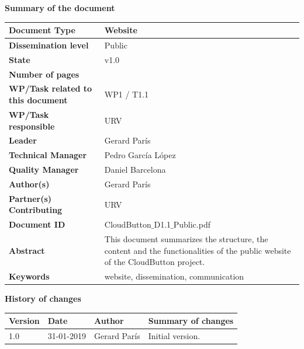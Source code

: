 \documentclass[a4paper,11pt]{article}
\numberwithin{table}{subsection} %
\begin{document}
{
\def\arraystretch{1.5} %

{\LARGE \textbf{Summary of the document}}

\begin{center}
    \begin{tabular}{ | l | p{10cm} |}
    \hline
    \cellcolor{gray!25} \textbf{Document Type} & Website  \\ \hline
    \cellcolor{gray!25} \textbf{Dissemination level} & Public \\ \hline
    \cellcolor{gray!25} \textbf{State} & v1.0 \\ \hline
    \cellcolor{gray!25} \textbf{Number of pages} & \pageref{LastPage} \\ \hline
    \cellcolor{gray!25} \textbf{WP/Task related to this document} & WP1 / T1.1 \\ \hline
    \cellcolor{gray!25} \textbf{WP/Task responsible} & URV  \\ \hline
    \cellcolor{gray!25} \textbf{Leader} & Gerard París \\ \hline
    \cellcolor{gray!25} \textbf{Technical Manager} & Pedro García López \\ \hline
    \cellcolor{gray!25} \textbf{Quality Manager} & Daniel Barcelona \\ \hline
    \cellcolor{gray!25} \textbf{Author(s)} & Gerard París \\ \hline
    \cellcolor{gray!25} \textbf{Partner(s) Contributing} & URV \\ \hline
    \cellcolor{gray!25} \textbf{Document ID} & CloudButton$\_$D1.1$\_$Public.pdf \\ \hline
    \cellcolor{gray!25} \textbf{Abstract} & This document summarizes the structure, the content and the functionalities of the public website of the CloudButton project. \\ \hline
    \cellcolor{gray!25} \textbf{Keywords} & website, dissemination, communication \\ \hline
    \end{tabular}
\end{center}
}


\newpage\pagestyle{empty}

{
\def\arraystretch{1.5} %

{\LARGE \textbf{History of changes}}

\begin{center}
    \begin{tabular}{ | l | l | p{3cm} | p{9cm} | }
    \hline
    \rowcolor[gray]{0.8}
    \textbf{Version} &
    \textbf{Date} &
    \textbf{Author} &
    \textbf{Summary of changes} \\ \hline

    1.0 & 31-01-2019 & Gerard París & Initial version. \\ \hline
    \end{tabular}
\end{center}
}
\end{document}

